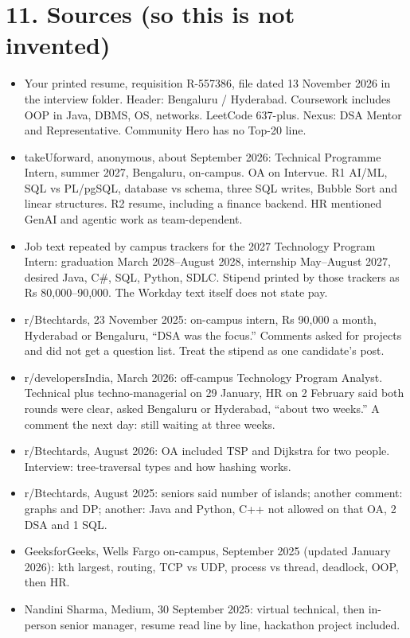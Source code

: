 \documentclass[a4paper,9.5pt]{extarticle}
\begin{document}
\section{11. Sources (so this is not invented)}
\begin{itemize}
  \item Your printed resume, requisition R-557386, file dated 13 November 2026 in the interview folder. Header: Bengaluru / Hyderabad. Coursework includes OOP in Java, DBMS, OS, networks. LeetCode 637-plus. Nexus: DSA Mentor and Representative. Community Hero has no Top-20 line.
  \item takeUforward, anonymous, about September 2026: Technical Programme Intern, summer 2027, Bengaluru, on-campus. OA on Intervue. R1 AI/ML, SQL vs PL/pgSQL, database vs schema, three SQL writes, Bubble Sort and linear structures. R2 resume, including a finance backend. HR mentioned GenAI and agentic work as team-dependent.
  \item Job text repeated by campus trackers for the 2027 Technology Program Intern: graduation March 2028--August 2028, internship May--August 2027, desired Java, C\#, SQL, Python, SDLC. Stipend printed by those trackers as Rs 80{,}000--90{,}000. The Workday text itself does not state pay.
  \item r/Btechtards, 23 November 2025: on-campus intern, Rs 90{,}000 a month, Hyderabad or Bengaluru, ``DSA was the focus.'' Comments asked for projects and did not get a question list. Treat the stipend as one candidate's post.
  \item r/developersIndia, March 2026: off-campus Technology Program Analyst. Technical plus techno-managerial on 29 January, HR on 2 February said both rounds were clear, asked Bengaluru or Hyderabad, ``about two weeks.'' A comment the next day: still waiting at three weeks.
  \item r/Btechtards, August 2026: OA included TSP and Dijkstra for two people. Interview: tree-traversal types and how hashing works.
  \item r/Btechtards, August 2025: seniors said number of islands; another comment: graphs and DP; another: Java and Python, C++ not allowed on that OA, 2 DSA and 1 SQL.
  \item GeeksforGeeks, Wells Fargo on-campus, September 2025 (updated January 2026): kth largest, routing, TCP vs UDP, process vs thread, deadlock, OOP, then HR.
  \item Nandini Sharma, Medium, 30 September 2025: virtual technical, then in-person senior manager, resume read line by line, hackathon project included.

\end{itemize}
\end{document}
